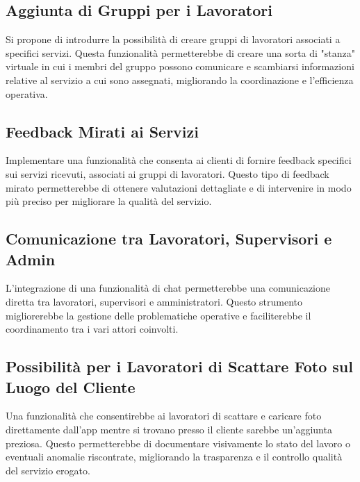 \documentclass[twoside]{supsistudent}
\begin{document}
\subsection{Aggiunta di Gruppi per i Lavoratori}

Si propone di introdurre la possibilità di creare gruppi di lavoratori associati a specifici servizi. Questa funzionalità permetterebbe di creare una sorta di "stanza" virtuale in cui i membri del gruppo possono comunicare e scambiarsi informazioni relative al servizio a cui sono assegnati, migliorando la coordinazione e l'efficienza operativa.

\subsection{Feedback Mirati ai Servizi}

Implementare una funzionalità che consenta ai clienti di fornire feedback specifici sui servizi ricevuti, associati ai gruppi di lavoratori. Questo tipo di feedback mirato permetterebbe di ottenere valutazioni dettagliate e di intervenire in modo più preciso per migliorare la qualità del servizio.

\subsection{Comunicazione tra Lavoratori, Supervisori e Admin}

L'integrazione di una funzionalità di chat permetterebbe una comunicazione diretta tra lavoratori, supervisori e amministratori. Questo strumento migliorerebbe la gestione delle problematiche operative e faciliterebbe il coordinamento tra i vari attori coinvolti.

\subsection{Possibilità per i Lavoratori di Scattare Foto sul Luogo del Cliente}

Una funzionalità che consentirebbe ai lavoratori di scattare e caricare foto direttamente dall'app mentre si trovano presso il cliente sarebbe un'aggiunta preziosa. Questo permetterebbe di documentare visivamente lo stato del lavoro o eventuali anomalie riscontrate, migliorando la trasparenza e il controllo qualità del servizio erogato.




\end{document}
